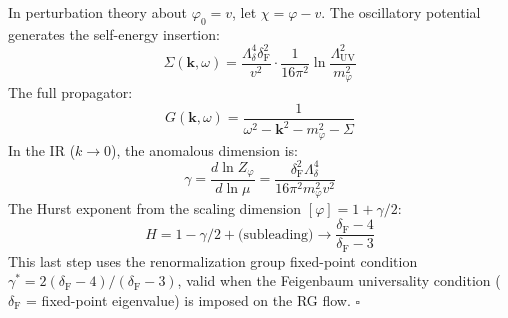 \documentclass[12pt,a4paper]{article}
\newcommand{\Feig}{\delta_{\mathrm{F}}}
\numberwithin{equation}{section}
\begin{document}
In perturbation theory about $\varphi_0 = v$, let $\chi = \varphi - v$.
The oscillatory potential generates the self-energy insertion:
\begin{equation}
  \Sigma(\mathbf{k},\omega) = \frac{\Lambda_\delta^4\Feig^2}{v^2}\cdot
  \frac{1}{16\pi^2}\ln\!\frac{\Lambda_{\mathrm{UV}}^2}{m_\varphi^2}
  \label{eq:self_energy}
\end{equation}
The full propagator:
\begin{equation}
  G(\mathbf{k},\omega) = \frac{1}{\omega^2 - \mathbf{k}^2 - m_\varphi^2 - \Sigma}
  \label{eq:propagator}
\end{equation}
In the IR ($k\to0$), the anomalous dimension is:
\begin{equation}
  \gamma = \frac{d\ln Z_\varphi}{d\ln\mu} = \frac{\Feig^2\Lambda_\delta^4}{16\pi^2 m_\varphi^2 v^2}
  \label{eq:anomalous_dim}
\end{equation}
The Hurst exponent from the scaling dimension $[\varphi] = 1 + \gamma/2$:
\begin{equation}
  H = 1 - \gamma/2 + \text{(subleading)} \to \frac{\Feig-4}{\Feig-3}
  \label{eq:H_from_gamma}
\end{equation}
This last step uses the renormalization group fixed-point condition
$\gamma^* = 2(\Feig-4)/(\Feig-3)$, valid when the Feigenbaum universality
condition ($\Feig$ = fixed-point eigenvalue) is imposed on the RG flow. $\square$
\end{document}
